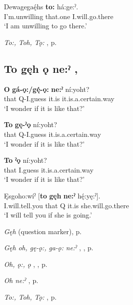 \ea
\label{ex:tpart70}
\gll Dewagegaę́hs \textbf{to:} há:ge:ˀ.\\
I’m.unwilling that.one I.will.go.there\\
\glt ‘I am unwilling to go there.’
\z

\begin{CayugaRelated}
\item \textit{To:, Toh, Tǫ:} , p. \pageref{p:[to:] ‘that one’}
\end{CayugaRelated}


\subsection*{\textbf{To gęh ǫ ne:ˀ} , } \label{p:[to gęh ǫ ne:ˀ]}

\ea
\label{ex:tpart71}
\gll \textbf{O} \textbf{gá-ǫ:/gę́-ǫ:} \textbf{ne:ˀ} ní:yoht?\\
that Q-I.guess it.is it.is.a.certain.way\\
\glt ‘I wonder if it is like that?’
\z

\ea
\label{ex:tpart72}
\gll \textbf{To} \textbf{gę-ˀǫ} ní:yoht?\\
that Q-I.guess it.is.a.certain.way\\
\glt ‘I wonder if it is like that?’
\z

\ea
\label{ex:tpart73}
\gll \textbf{To} \textbf{ˀǫ} ní:yoht?\\
that I.guess it.is.a.certain.way\\
\glt ‘I wonder if it is like that?’
\z

\ea
\label{ex:tpart74}
\gll Ęsgoho:wíˀ [\textbf{to} \textbf{gęh} \textbf{ne:ˀ} hę́:yę:ˀ].\\
I.will.tell.you that Q it.is she.will.go.there\\
\glt ‘I will tell you if she is going.’
\z

\begin{CayugaRelated}
\item \textit{Gęh}  (question marker), p. \pageref{p:[gęh] `Q’}\\
\item \textit{Gęh oh, gę-ǫ:, ga-ǫ: ne:ˀ} , , p. \pageref{p:[gęh oh, gę-ǫ:]}\\
\item \textit{Oh, ǫ:, ǫ} , , p. \pageref{p:[ǫh, ǫ:, ǫ]}\\
\item \textit{Oh ne:ˀ} , p. \pageref{p:[ǫh ne:ˀ]}\\
\item \textit{To:, Toh, Tǫ:} , p. \pageref{p:[to:] ‘that one’}
\end{CayugaRelated}


